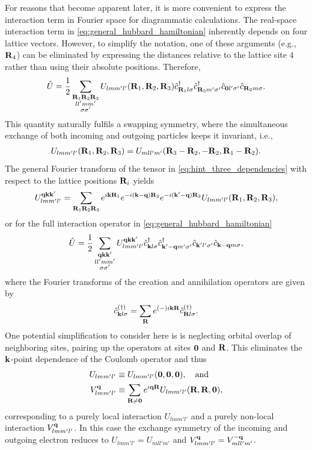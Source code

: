 \documentclass[../../main.tex]{subfiles}
\begin{document}
For reasons that become apparent later, it is more convenient to express the interaction term in Fourier space for diagrammatic calculations. The real-space interaction term in \eqref{eq:general_hubbard_hamiltonian} inherently depends on four lattice vectors. However, to simplify the notation, one of these arguments (e.g., $\textbf{R}_4$) can be eliminated by expressing the distances relative to the lattice site $4$ rather than using their absolute positions. Therefore, 
\begin{align}
	\hat U=\frac 12 \sum_{\substack{\textbf{R}_1\textbf{R}_2\textbf{R}_3\\ ll'mm'\\\sigma\sigma'}}U_{lmm'l'}(\textbf{R}_1,\textbf{R}_2,\textbf{R}_3) \hat c^{\dagger}_{\textbf{R}_1l\sigma} \hat c^{\dagger}_{\textbf{R}_3 m'\sigma'} \hat c_{\textbf{0}l'\sigma'} \hat c_{\textbf{R}_2m\sigma}.\label{eq:hint_three_dependencies}
\end{align} 
This quantity naturally fulfils a swapping symmetry, where the simultaneous exchange of both incoming and outgoing particles keeps it invariant, i.e.,
\begin{align}
 	U_{lmm'l'}(\textbf{R}_1,\textbf{R}_2,\textbf{R}_3)=U_{mll'm'}(\textbf{R}_3-\textbf{R}_2,-\textbf{R}_2,\textbf{R}_1-\textbf{R}_2).
\end{align} 
The general Fourier transform of the tensor in \eqref{eq:hint_three_dependencies} with respect to the lattice positions $\textbf{R}_i$ yields
\begin{align}
	U_{lmm'l'}^{\textbf{qkk}'}=\sum_{\textbf{R}_1\textbf{R}_2\textbf{R}_3} e^{i\textbf{kR}_1}e^{-i(\textbf{k}-\textbf{q})\textbf{R}_2}e^{-i(\textbf{k}'-\textbf{q})\textbf{R}_3}U_{lmm'l'}(\textbf{R}_1,\textbf{R}_2,\textbf{R}_3),
\end{align}
or for the full interaction operator in \eqref{eq:general_hubbard_hamiltonian}
\begin{align}
	\hat U=\frac 12 \sum_{\substack{\textbf{qkk}'\\ ll'mm'\\\sigma\sigma'}}U_{lmm'l'}^{\textbf{qkk}'}\hat c^{\dagger}_{\textbf{k}l\sigma} \hat c^{\dagger}_{\textbf{k}'-\textbf{q} m'\sigma'} \hat c_{\textbf{k}'l'\sigma'} \hat c_{\textbf{k}-\textbf{q}m\sigma},
\end{align}
where the Fourier transforms of the creation and annihilation operators are given by
\begin{align}
	\hat c^{(\dagger)}_{\textbf{k}l\sigma}=\sum_{\textbf{R}}e^{(-)i\textbf{kR}}\hat c^{(\dagger)}_{\textbf{R}l\sigma}.
\end{align}
One potential simplification to consider here is is neglecting orbital overlap of neighboring sites, pairing up the operators at sites $\textbf{0}$ and $\textbf{R}$. This eliminates the $\textbf{k}$-point dependence of the Coulomb operator and thus
\begin{align}
	U_{lmm'l'}&\equiv U_{lmm'l'}(\textbf{0},\textbf{0},\textbf{0}),\quad\text{and}\\
	V^{\textbf{q}}_{lmm'l'}&\equiv\sum_{\textbf{R}\neq\textbf{0}}e^{i\textbf{qR}}U_{lmm'l'}(\textbf{R},\textbf{R},\textbf{0}),
\end{align}
corresponding to a purely local interaction $U_{lmm'l'}$ and a purely non-local interaction $V^{\textbf{q}}_{lmm'l'}$. In this case the exchange symmetry of the incoming and outgoing electron reduces to $U_{lmm'l'}=U_{mll'm'}$ and $V^{\textbf{q}}_{lmm'l'}=V^{-\textbf{q}}_{mll'm'}$.
\end{document}
